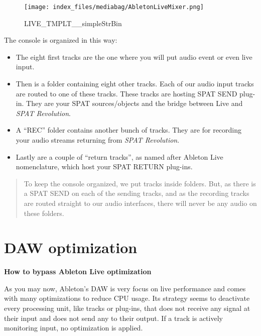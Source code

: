\documentclass[
  letterpaper,
  DIV=11,
  numbers=noendperiod]{scrreport}
\begin{document}
\begin{figure}

{\centering \texttt{[image: index\_files/mediabag/AbletonLiveMixer.png]}

}

\caption{LIVE\_TMPLT\_\_simpleStrBin}

\end{figure}

The console is organized in this way:

\begin{itemize}
\item
  The eight first tracks are the one where you will put audio event or
  even live input.
\item
  Then is a folder containing eight other tracks. Each of our audio
  input tracks are routed to one of these tracks. These tracks are
  hosting SPAT SEND plug-in. They are your SPAT sources/objects and the
  bridge between Live and \emph{SPAT Revolution}.
\item
  A ``REC'' folder contains another bunch of tracks. They are for
  recording your audio streams returning from \emph{SPAT Revolution}.
\item
  Lastly are a couple of ``return tracks'', as named after Ableton Live
  nomenclature, which host your SPAT RETURN plug-ins.
\end{itemize}

\begin{quote}
To keep the console organized, we put tracks inside folders. But, as
there is a SPAT SEND on each of the sending tracks, and as the recording
tracks are routed straight to our audio interfaces, there will never be
any audio on these folders.
\end{quote}

\hypertarget{daw-optimization}{%
\section{DAW optimization}\label{daw-optimization}}

\textbf{How to bypass Ableton Live optimization}

As you may now, Ableton's DAW is very focus on live performance and
comes with many optimizations to reduce CPU usage. Its strategy seems to
deactivate every processing unit, like tracks or plug-ins, that does not
receive any signal at their input and does not send any to their output.
If a track is actively monitoring input, no optimization is applied.
\end{document}
